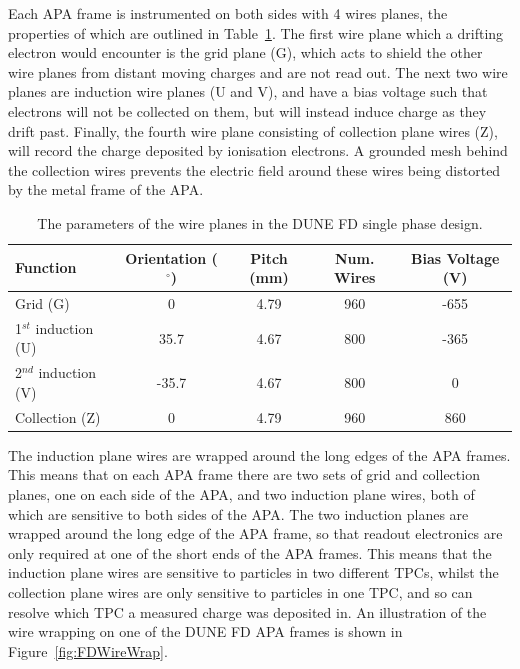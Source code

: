 Each APA frame is instrumented on both sides with 4 wires planes, the properties of which are outlined in Table~\ref{tab:DUNE_SP_WP}. The first wire plane which a drifting electron would encounter is the grid plane (G), which acts to shield the other wire planes from distant moving charges and are not read out. The next two wire planes are induction wire planes (U and V), and have a bias voltage such that electrons will not be collected on them, but will instead induce charge as they drift past. Finally, the fourth wire plane consisting of collection plane wires (Z), will record the charge deposited by ionisation electrons. A grounded mesh behind the collection wires prevents the electric field around these wires being distorted by the metal frame of the APA. \\

\begin{table}
  \caption[The parameters of the wire planes in the DUNE FD single phase design]
          {The parameters of the wire planes in the DUNE FD single phase design.}
  \label{tab:DUNE_SP_WP}
  \centering
  \begin{tabular}{l c c c c}
    \toprule
    {Function}             & {Orientation ($^{\circ}$)} & {Pitch (mm)} & Num. Wires & Bias Voltage (V) \\ 
    \midrule
    Grid (G)               & 0                          & 4.79         & 960        & -655 \\
    
    1$^{st}$ induction (U) & 35.7                       & 4.67         & 800        & -365 \\
    
    2$^{nd}$ induction (V) & -35.7                      & 4.67         & 800        & 0    \\
    
    Collection (Z)         & 0                          & 4.79         & 960        & 860 \\
    \bottomrule
  \end{tabular}
\end{table}

The induction plane wires are wrapped around the long edges of the APA frames. This means that on each APA frame there are two sets of grid and collection planes, one on each side of the APA, and two induction plane wires, both of which are sensitive to both sides of the APA. The two induction planes are wrapped around the long edge of the APA frame, so that readout electronics are only required at one of the short ends of the APA frames. This means that the induction plane wires are sensitive to particles in two different TPCs, whilst the collection plane wires are only sensitive to particles in one TPC, and so can resolve which TPC a measured charge was deposited in. An illustration of the wire wrapping on one of the DUNE FD APA frames is shown in Figure~\ref{fig:FDWireWrap}. \\

